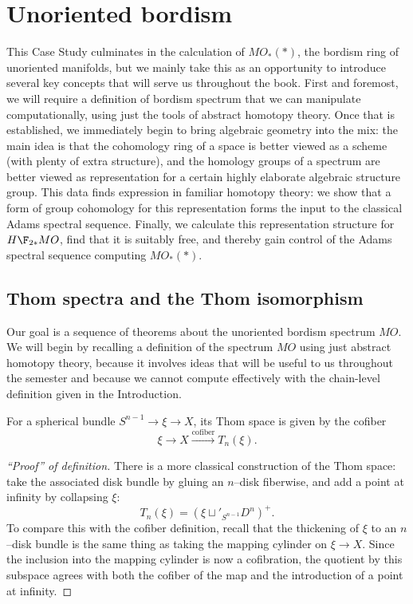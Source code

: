 
\chapter{Unoriented bordism}\label{UnorientedBordismChapter}




This Case Study culminates in the calculation of $MO_*(*)$, the bordism ring of unoriented manifolds, but we mainly take this as an opportunity to introduce several key concepts that will serve us throughout the book.  First and foremost, we will require a definition of bordism spectrum that we can manipulate computationally, using just the tools of abstract homotopy theory.  Once that is established, we immediately begin to bring algebraic geometry into the mix: the main idea is that the cohomology ring of a space is better viewed as a scheme (with plenty of extra structure), and the homology groups of a spectrum are better viewed as representation for a certain highly elaborate algebraic structure group.  This data finds expression in familiar homotopy theory: we show that a form of group cohomology for this representation forms the input to the classical Adams spectral sequence.  Finally, we calculate this representation structure for $H\F_{2*} MO$, find that it is suitably free, and thereby gain control of the Adams spectral sequence computing $MO_*(*)$.





\section{Thom spectra and the Thom isomorphism}\label{LectureThomSpectra}

Our goal is a sequence of theorems about the unoriented bordism spectrum $MO$.  We will begin by recalling a definition of the spectrum $MO$ using just abstract homotopy theory, because it involves ideas that will be useful to us throughout the semester and because we cannot compute effectively with the chain-level definition given in the Introduction.

\begin{definition}
For a spherical bundle $S^{n-1} \to \xi \to X$, its Thom space is given by the cofiber \[\xi \to X \xrightarrow{\text{cofiber}} T_n(\xi).\]
\end{definition}
\begin{proof}[``Proof'' of definition]
There is a more classical construction of the Thom space: take the associated disk bundle by gluing an $n$--disk fiberwise, and add a point at infinity by collapsing $\xi$: \[T_n(\xi) = (\xi \sqcup'_{S^{n-1}} D^n)^+.\]  To compare this with the cofiber definition, recall that the thickening of $\xi$ to an $n$--disk bundle is the same thing as taking the mapping cylinder on $\xi \to X$.  Since the inclusion into the mapping cylinder is now a cofibration, the quotient by this subspace agrees with both the cofiber of the map and the introduction of a point at infinity.
\end{proof}

